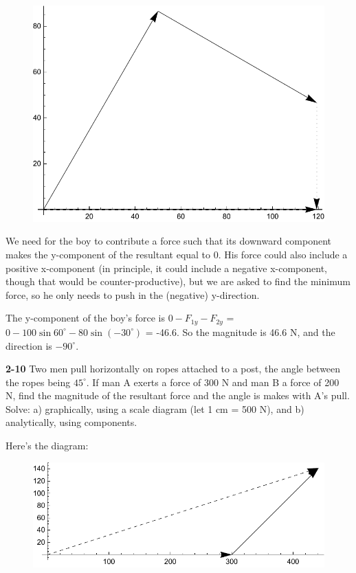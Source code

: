 \documentclass{amsart}
\begin{document}
\begin{figure}[h]
\includegraphics[scale=0.4]{2-9}
\end{figure}

We need for the boy to contribute a force such that its downward component makes the y-component
of the resultant equal to 0.  His force could also include a positive x-component
(in principle, it could include a negative x-component, though that would be counter-productive),
but we are asked to find the minimum force, so he only needs to push in the (negative) y-direction.

The y-component of the boy's force is $0 - F_{1y} - F_{2y}$ = $0 - 100 \sin 60^\circ - 80 \sin (-30^\circ)$ = -46.6.
So the magnitude is 46.6 N, and the direction is $-90^\circ$.

\vspace{\baselineskip}
\noindent
\textbf{2-10} Two men pull horizontally on ropes attached to a post, 
the angle between the ropes being $45^\circ$.
If man A exerts a force of 300 N and man B a force of 200 N,
find the magnitude of the resultant force and the angle is makes with A's pull.  Solve:\newline
a) graphically, using a scale diagram (let 1 cm = 500 N), and\newline
b) analytically, using components.

Here's the diagram:

\begin{figure}[h]
\includegraphics[scale=0.4]{2-10}
\end{figure}
\end{document}
